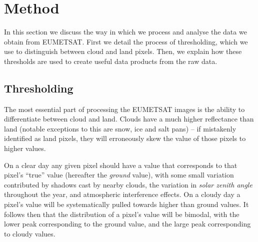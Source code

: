 \section{Method}
In this section we discuss the way in which we process and analyse the data we
obtain from EUMETSAT. First we detail the process of thresholding, which we use
to distinguish between cloud and land pixels. Then, we explain how these
thresholds are used to create useful data products from the raw data.

\subsection{Thresholding}
\label{sec:method:thr}
The most essential part of processing the EUMETSAT images is the ability to
differentiate between cloud and land. Clouds have a much higher reflectance than
land (notable exceptions to this are snow, ice and salt pans) -- if mistakenly
identified as land pixels, they will erroneously skew the value of those pixels
to higher values.

On a clear day any given pixel should have a value that corresponds to that
pixel's ``true'' value (hereafter the \emph{ground} value), with some small
variation contributed by shadows cast by nearby clouds, the variation in
\emph{solar zenith angle} throughout the year, and atmospheric interference
effects. On a cloudy day a pixel's value will be systematically pulled towards
higher than ground values. It follows then that the distribution of a pixel's
value will be bimodal, with the lower peak corresponding to the ground value,
and the large peak corresponding to cloudy values.

